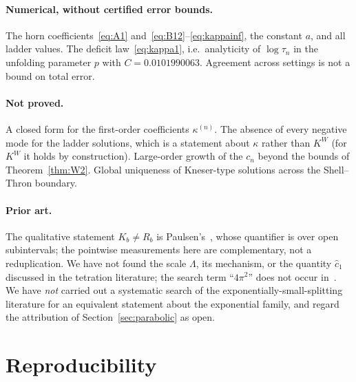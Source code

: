 \documentclass[11pt,a4paper]{article}
\theoremstyle{definition}
\newcommand{\Rr}{R}
\newcommand{\Kk}{K}
\newcommand{\chat}{\hat{c}_1}
\begin{document}
\paragraph{Numerical, without certified error bounds.}
The horn coefficients~\eqref{eq:A1} and~\eqref{eq:B12}--\eqref{eq:kappainf}, the
constant $a$, and all ladder values.  The deficit law~\eqref{eq:kappa1}, i.e.\
analyticity of $\log\tau_n$ in the unfolding parameter $p$ with
$C=0.0101990063$.  Agreement across settings is not a bound on total error.

\paragraph{Not proved.}
A closed form for the first-order coefficients $\kappa^{(n)}$.  The absence of
every negative mode for the ladder solutions, which is a statement about
$\kappa$ rather than $\Kk^W$ (for $\Kk^W$ it holds by construction).  Large-order
growth of the $c_n$ beyond the bounds of Theorem~\ref{thm:W2}.  Global
uniqueness of Kneser-type solutions across the Shell--Thron boundary.

\paragraph{Prior art.}
The qualitative statement $\Kk_b\ne \Rr_b$ is
Paulsen's~\cite[Prop.~4]{Paulsen2019}, whose quantifier is over open
subintervals; the pointwise measurements here are complementary, not a
reduplication.  We have not found the scale $\Lambda$, its mechanism, or the
quantity $\chat$ discussed in the tetration literature; the search
term ``$4\pi^{2}$'' does not occur in~\cite{Paulsen2019}.  We have \emph{not}
carried out a systematic search of the exponentially-small-splitting literature
for an equivalent statement about the exponential family, and regard the
attribution of Section~\ref{sec:parabolic} as open.

\section{Reproducibility}\label{sec:repro}
\end{document}
